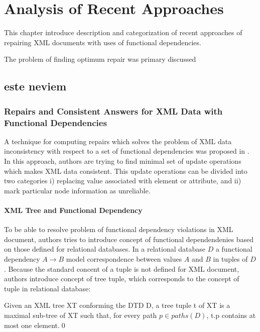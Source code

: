 \chapter{Analysis of Recent Approaches}

This chapter introduce description and categorization of recent approaches of repairing XML documents with uses of functional dependencies.

The problem of finding optimum repair was primary discussed

\section{este neviem}

\subsection{Repairs and Consistent Answers for XML Data with Functional Dependencies}

A technique for computing repairs which solves the problem of XML data inconsistency with respect to a set of functional dependencies was proposed in \cite{RepAndConsistentAnswer}. In this approach, authors are trying to find minimal set of update operations which makes XML data consistent. This update operations can be divided into two categories i) replacing value associated with element or attribute, and ii) mark particular node information as unreliable.

\subsubsection{XML Tree and Functional Dependency}

To be able to resolve problem of functional dependency violations in XML document, authors tries to introduce concept of functional dependendenies based on those defined for relational databases. In a relational database $D$ a functional dependency $A \rightarrow B$ model correspondence between values $A$ and $B$ in tuples of $D$. Because the standard concent of a tuple is not defined for XML document, authors introduce concept of tree tuple, which corresponds to the concept of tuple in relational database:

\begin{define}
Given an XML tree XT conforming the DTD D, a tree tuple t of XT is a maximal sub-tree of XT such that, for every path $p \in paths(D)$, t.p contains at most one element.\qed
\end{define}

